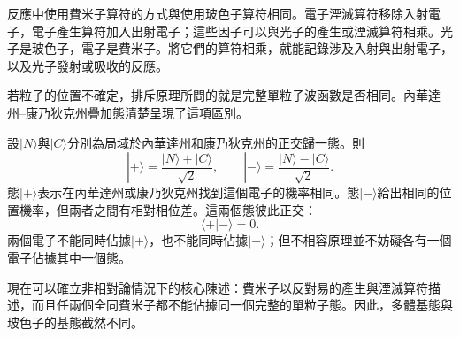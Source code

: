 反應中使用費米子算符的方式與使用玻色子算符相同。電子湮滅算符移除入射電子，電子產生算符加入出射電子；這些因子可以與光子的產生或湮滅算符相乘。光子是玻色子，電子是費米子。將它們的算符相乘，就能記錄涉及入射與出射電子，以及光子發射或吸收的反應。

\begin{classroomqa}
\end{classroomqa}


若粒子的位置不確定，排斥原理所問的就是完整單粒子波函數是否相同。內華達州--康乃狄克州疊加態清楚呈現了這項區別。

設\(|N\rangle\)與\(|C\rangle\)分別為局域於內華達州和康乃狄克州的正交歸一態。則
\begin{equation}
|+\rangle=\frac{|N\rangle+|C\rangle}{\sqrt2},
\qquad
|-\rangle=\frac{|N\rangle-|C\rangle}{\sqrt2}.
\end{equation}
態\(|+\rangle\)表示在內華達州或康乃狄克州找到這個電子的機率相同。態\(|-\rangle\)給出相同的位置機率，但兩者之間有相對相位差。這兩個態彼此正交：
\begin{equation}
\langle+|-\rangle=0.
\end{equation}
兩個電子不能同時佔據\(|+\rangle\)，也不能同時佔據\(|-\rangle\)；但不相容原理並不妨礙各有一個電子佔據其中一個態。

\begin{classroomqa}
\end{classroomqa}

\begin{classroomqa}
\end{classroomqa}

現在可以確立非相對論情況下的核心陳述：費米子以反對易的產生與湮滅算符描述，而且任兩個全同費米子都不能佔據同一個完整的單粒子態。因此，多體基態與玻色子的基態截然不同。

